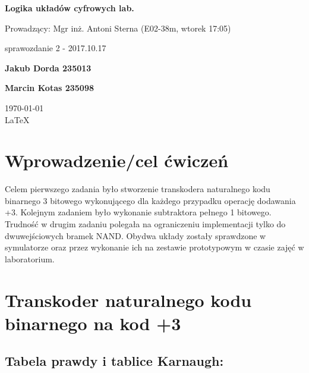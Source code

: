 \documentclass[12pt,a4paper]{article}
\begin{document}
	
	\begin{titlepage}
		
		\centering
		{\huge\bfseries Logika układów cyfrowych lab.\par}
		
		\vspace{0.5cm}
		Prowadzący: Mgr inż. Antoni Sterna (E02-38m, wtorek 17:05) \\
	
		\vspace{1.1cm}
		{\Large sprawozdanie 2 - 2017.10.17\par}
		\vfill
		
		{\large\bfseries Jakub Dorda 235013\par}
		{\large\bfseries Marcin Kotas 235098\par}
		
		\vspace{1cm}
		\today \\ \LaTeX
		
		\restoregeometry
	\end{titlepage}

	
	\section{Wprowadzenie/cel ćwiczeń}
	
		Celem pierwszego zadania było stworzenie transkodera naturalnego kodu binarnego 3 bitowego wykonującego dla każdego przypadku operację dodawania +3. Kolejnym zadaniem było wykonanie subtraktora pełnego 1 bitowego. Trudność w drugim zadaniu polegała na ograniczeniu implementacji tylko do dwuwejściowych bramek NAND. Obydwa układy zostały sprawdzone w symulatorze oraz przez wykonanie ich na zestawie prototypowym w czasie zajęć w laboratorium. 
	
	\section{Transkoder naturalnego kodu binarnego na kod +3}
		
		\subsection{Tabela prawdy i tablice Karnaugh:}
			
\end{document}
